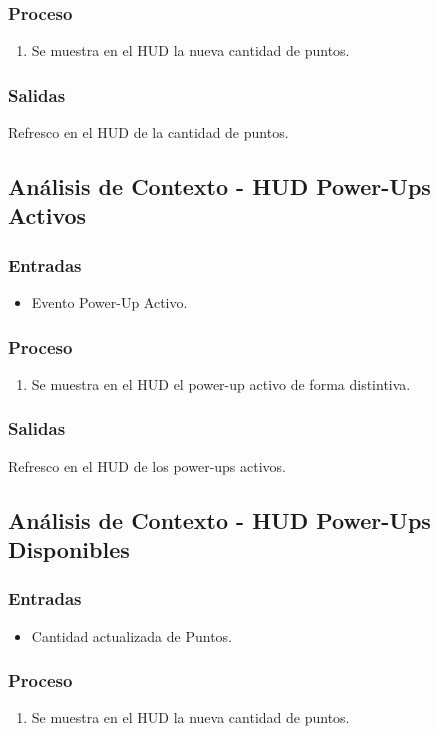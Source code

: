\documentclass[letterpaper]{scrreprt}
\begin{document}
\subsubsection{Proceso}
\begin{enumerate}
	\item Se muestra en el HUD la nueva cantidad de puntos.
\end{enumerate}
\subsubsection{Salidas}
Refresco en el HUD de la cantidad de puntos.

\subsection{Análisis de Contexto - HUD Power-Ups Activos}
\subsubsection{Entradas}
\begin{itemize}
	\item Evento Power-Up Activo.
\end{itemize}
\subsubsection{Proceso}
\begin{enumerate}
	\item Se muestra en el HUD el power-up activo de forma distintiva.
\end{enumerate}
\subsubsection{Salidas}
Refresco en el HUD de los power-ups activos.

\subsection{Análisis de Contexto - HUD Power-Ups Disponibles}
\subsubsection{Entradas}
\begin{itemize}
	\item Cantidad actualizada de Puntos.
\end{itemize}
\subsubsection{Proceso}
\begin{enumerate}
	\item Se muestra en el HUD la nueva cantidad de puntos.
\end{enumerate}
\end{document}
